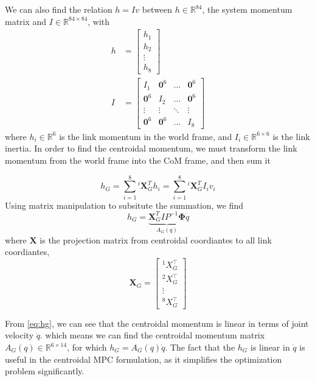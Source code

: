 \documentclass[conference]{IEEEtran}
\begin{document}
We can also find the relation $h = I v$ between $h \in \mathbb{R}^{84}$, the system momentum matrix and $I \in \mathbb{R}^{84 \times 84}$, with
\begin{align}
    h & = \begin{bmatrix}
        h_1 \\ h_2 \\ \vdots \\ h_8
    \end{bmatrix} \\
    I & = \begin{bmatrix}
        I_1 & \mathbf{0}^{6} & \dots & \mathbf{0}^{6} \\
        \mathbf{0}^{6} & I_2 & \dots  & \mathbf{0}^{6} \\
        \vdots & \vdots & \ddots & \vdots\\
        \mathbf{0}^{6} &\mathbf{0}^{6} &\dots & I_8
    \end{bmatrix}
\end{align}
where $h_i \in \mathbb{R}^6 $ is the link momentum in the world frame, and $I_i \in \mathbb{R}^{6 \times 6}$ is the link inertia. In order to find the centroidal momentum, we must transform the link momentum from the world frame into the CoM frame, and then sum it

\begin{equation}
    h_G = \sum^8_{i=1} {}^i\mathbf{X}^T_G h_i = \sum^8_{i=1} {}^i\mathbf{X}^T_G I_i v_i
\end{equation}
Using matrix manipulation to subsitute the summation, we find
\begin{equation}
    h_G = \underbrace{\mathbf{X}^T_G I P^{-1} \mathbf{\Phi}}_{A_G(q)} \dot{q}
    \label{eq:hg}
\end{equation}
where $\mathbf{X}$ is the projection matrix from centroidal coordiantes to all link coordiantes,
\begin{equation}
    \mathbf{X}_G = \begin{bmatrix}
        ^1X_G^\top\\
        ^2X_G^\top\\
        \vdots \\
        ^8X_G^\top
    \end{bmatrix}
\end{equation}

From \eqref{eq:hg}, we can see that the centroidal momentum is linear in terms of joint velocity $\dot{q}$.  which means we can find the centroidal momentum matrix $A_G(q) \in \mathbb{R}^{6 \times 14}$, for which $h_G = A_G(q) \dot{q}$. The fact that the $h_G$ is linear in $\dot{q}$ is useful in the centroidal MPC formulation, as it simplifies the optimization problem significantly.
\end{document}
